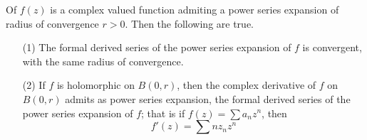 \begin{theorem}\label{2.5.1}
    Of $f(z)$ is a complex valued function admiting a power series expansion of
    radius of convergence $r>0$. Then the following are true.
    \begin{enumerate}
        \item[(1)] The formal derived series of the power series expansion of
            $f$ is convergent, with the same radius of convergence.

        \item[(2)] If $f$ is holomorphic on $B(0,r)$, then the complex
            derivative of $f$ on  $B(0,r)$ admits as power series expansion, the
            formal derived series of the power series expansion of $f$; that is
            if  $f(z)=\sum{a_nz^n}$, then
            \begin{equation*}
                f'(z)=\sum{nz_nz^n}
            \end{equation*}
    \end{enumerate}
\end{theorem}
